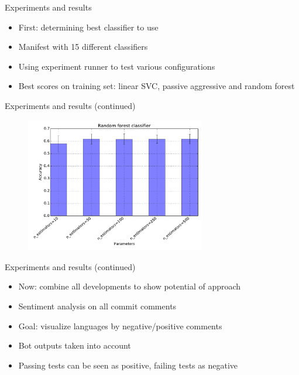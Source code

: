 \documentclass[t,11pt]{beamer}
\begin{document}
\begin{frame}[fragile]{Experiments and results}
\begin{itemize}
  \item First: determining best classifier to use
  \item Manifest with 15 different classifiers
  \item Using experiment runner to test various configurations
  \item Best scores on training set: linear SVC, passive aggressive and random forest
\end{itemize}
\end{frame}

\begin{frame}[fragile]{Experiments and results (continued)}
  \begin{figure}
    \centering
    \includegraphics[width=0.7\textwidth]{../plots/experiment_results-Random_forest_classifier.pdf}
  \end{figure}
\end{frame}

\begin{frame}[fragile]{Experiments and results (continued)}
\begin{itemize}
  \item Now: combine all developments to show potential of approach
  \item Sentiment analysis on all commit comments
  \item Goal: visualize languages by negative/positive comments
  \item Bot outputs taken into account
  \item Passing tests can be seen as positive, failing tests as negative
\end{itemize}
\end{frame}
\end{document}
